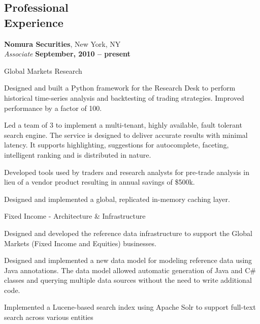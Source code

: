 \documentclass[margin,line]{resume}
\begin{document}
\begin{resume}
    \section{\mysidestyle Professional\\Experience}
    
  {\bf Nomura Securities}, New York, NY \vspace{1mm}\\\vspace{1mm}%
    {\sl Associate} \hfill {\bf September, 2010 -- present}\\
    \vspace{-3mm}
    \begin{list2}
    	        \item Global Markets Research
		\begin{list3} 
			\item Designed and built a Python framework for the Research Desk to perform historical time-series analysis and backtesting of trading strategies. Improved performance by a factor of 100. 			
			\item Led a team of 3 to implement a multi-tenant, highly available, fault tolerant search engine. The service is designed to deliver accurate results with minimal latency. It supports highlighting, suggestions for autocomplete, faceting, intelligent ranking and is distributed in nature.
			\item Developed tools used by traders and research analysts for pre-trade analysis in lieu of a vendor product resulting in annual savings of \$500k.
			\item Designed and implemented a global, replicated in-memory caching layer.
		\end{list3}
        \item Fixed Income - Architecture \& Infrastructure
		\begin{list3}        	
			\item Designed and developed the reference data infrastructure to support the Global Markets (Fixed Income and Equities) businesses.
			\item Designed and implemented a new data model for modeling reference data using Java annotations. The data model allowed automatic generation of Java and C\# classes and querying multiple data sources without the need to write additional code.  
			\item Implemented a Lucene-based search index using Apache Solr to support full-text search across various entities
		\end{list3}
    \end{list2}
    


\end{resume}
\end{document}
